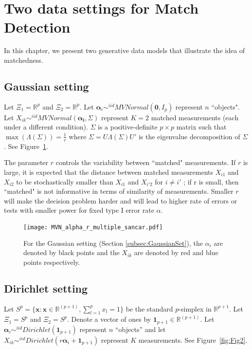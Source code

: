 \documentclass[12pt,oneside,final]{thesis}
\begin{document}
\section{Two data settings for Match Detection\label{sec:data_settings}}


  In this chapter, we present two generative data models that illustrate the idea of matchedness.
\subsection{Gaussian setting\label{subsec:GaussianSet}}
  Let    $\Xi_1 = \mathbb{R}^{p}$ and $\Xi_2 = \mathbb{R}^{p}$.
  Let $\bm{\alpha}_i \sim^{iid} MVNormal(\bm{0},I_p)$ represent $n$ ``objects".  Let $X_{ik} \sim^{iid} MVNormal(\bm{\alpha_i},\Sigma)$ represent $K=2$ matched measurements (each under a different condition).
  $\Sigma$ is a positive-definite $p\times p$ matrix such that  $\max(\Lambda(\Sigma))=\frac{1}{r} $ where $\Sigma=U\Lambda(\Sigma)U'$  is the eigenvalue decomposition of $\Sigma$. See Figure~\ref{fig:Fig1}.

The parameter $r$ controls the variability between ``matched" measurements. If $r$ is large, it is expected that the distance between matched measurements
$X_{i1}$ and $X_{i2}$ to be stochastically smaller than $X_{i1}$ and $X_{i'2}$ for $i \neq i'$ ; if r is small, then ``matched" is not informative in terms of similarity of measurements.
 Smaller $r$ will make the decision problem harder and will lead to higher rate of errors or tests with smaller power for fixed type I error rate $\alpha$.
  
    \begin{figure}
  \begin{center}
    \texttt{[image: MVN\_alpha\_r\_multiple\_sancar.pdf]}
    \caption{For the  Gaussian setting (Section \ref{subsec:GaussianSet}), the $\alpha_i$ are denoted by black points and the $X_{ik}$ are denoted by red and blue points respectively.\label{fig:Fig1}}
	\end{center}
  \end{figure}

\subsection{Dirichlet setting\label{subsec:DirichletSet}}
Let $S^p=\{\bm{x}:\bm{x}\in\mathbb{R}^{(p+1)}, \sum_{l=1}^p{x_l}=1\}$ be the standard $p$-simplex in $\mathbb{R}^{p+1}$.
 Let $\Xi_1 = S^p$ and $\Xi_2 = S^p$.   Denote a vector of ones by $\bm{1}_{p+1}\in \mathbb{R}^{(p+1)}$.
  Let $\bm{\alpha}_i \sim^{iid} Dirichlet(\bm{1}_{p+1})$ represent $n$  ``objects'' and let $X_{ik} \sim^{iid} Dirichlet(r\bm{\alpha}_i+\bm{1}_{p+1})$ represent $K$ measurements. See Figure~\ref{fig:Fig2}.
\end{document}
